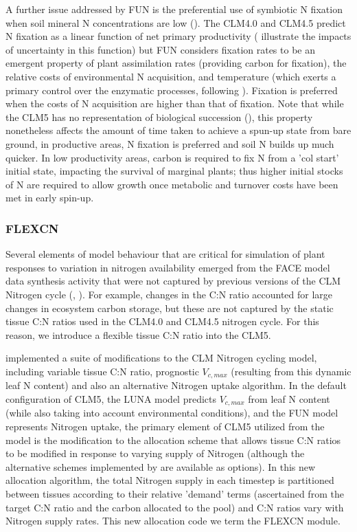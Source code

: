 \documentclass[draft,linenumbers]{agujournal}
\begin{document}
A further issue addressed by FUN is the preferential use of symbiotic N fixation when soil mineral N concentrations are low (\cite{vitousek2002}). The CLM4.0 and CLM4.5 predict N fixation as a linear function of net primary productivity (\cite{wieder2015} illustrate the impacts of uncertainty in this function) but FUN considers fixation rates to be an emergent property of plant assimilation rates (providing carbon for fixation), the relative costs of environmental N acquisition, and temperature (which exerts a primary control over the enzymatic processes, following \cite{houlton2008}). Fixation is preferred when the costs of N acquisition are higher than that of fixation. Note that while the CLM5 has no representation of biological succession (\cite{fisher2018}), this property nonetheless affects the amount of time taken to achieve a spun-up state from bare ground, in productive areas, N fixation is preferred and soil N builds up much quicker. In low productivity areas, carbon is required to fix N from a 'col start' initial state, impacting the survival of marginal plants; thus higher initial stocks of N are required to allow growth once metabolic and turnover costs have been met in early spin-up.


\subsubsection{FLEXCN}

Several elements of model behaviour that are critical for simulation of plant responses to variation in nitrogen availability emerged from the FACE model data synthesis activity that were not captured by previous versions of the CLM Nitrogen cycle (\cite{zaehle2014}, \cite{medlyn2015using}). For example, changes in the C:N ratio accounted for large changes in ecosystem carbon storage, but these are not captured by the static tissue C:N ratios used in the CLM4.0 and CLM4.5 nitrogen cycle. For this reason, we introduce a flexible tissue C:N ratio into the CLM5.


\cite{ghimire2016} implemented a suite of modifications to the CLM Nitrogen cycling model, including variable tissue C:N ratio, prognostic $V_{c,max}$ (resulting from this dynamic leaf N content) and also an alternative Nitrogen uptake algorithm. In the default configuration of CLM5, the LUNA model predicts $V_{c,max}$ from leaf N content (while also taking into account environmental conditions), and the FUN model represents Nitrogen uptake, the primary element of CLM5 utilized from the \cite{ghimire2016} model is the modification to the allocation scheme that allows tissue C:N ratios to be modified in response to varying supply of Nitrogen (although the alternative schemes implemented by \cite{ghimire2016} are available as options). In this new allocation algorithm, the total Nitrogen supply in each timestep is partitioned between tissues according to their relative 'demand' terms (ascertained from the target C:N ratio and the carbon allocated to the pool) and C:N ratios vary with Nitrogen supply rates. This new allocation code we term the FLEXCN module.
\end{document}
